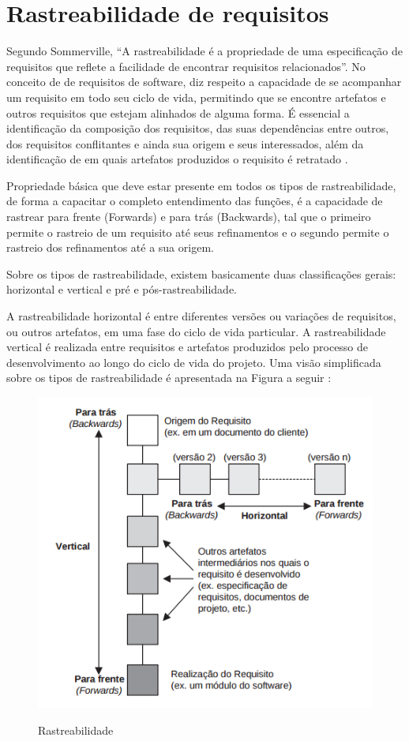 \section{Rastreabilidade de requisitos}

Segundo Sommerville, “A rastreabilidade é a propriedade de uma especificação de requisitos que reflete a facilidade de encontrar requisitos relacionados”. No conceito de de requisitos de software, diz respeito a capacidade de se acompanhar um requisito em todo seu ciclo de vida, permitindo que se encontre artefatos e outros requisitos que estejam alinhados de alguma forma. É essencial a identificação da composição dos requisitos, das suas dependências entre outros, dos requisitos conflitantes e ainda sua origem e seus interessados, além da identificação de em quais artefatos produzidos o requisito é retratado \cite {falbo}.

Propriedade básica que deve estar presente em todos os tipos de rastreabilidade, de forma a capacitar o completo entendimento das funções, é a capacidade de rastrear para frente (Forwards) e para trás (Backwards), tal que o primeiro permite o rastreio de um requisito até seus refinamentos e  o segundo permite o rastreio dos refinamentos até a sua origem. \cite {davis}

Sobre os tipos de rastreabilidade, existem basicamente duas classificações gerais: horizontal e vertical e pré e pós-rastreabilidade. \cite {gotel}

A rastreabilidade horizontal é entre diferentes versões ou variações de requisitos, ou outros artefatos, em uma fase do ciclo de vida particular. A rastreabilidade vertical é realizada entre requisitos e artefatos produzidos pelo processo de desenvolvimento ao longo do ciclo de vida do projeto.
Uma visão simplificada sobre os tipos de rastreabilidade é apresentada na Figura a seguir \cite {inpe}:

\FloatBarrier
\begin{figure}[!htpd]
		\centering
		\includegraphics[scale=0.8]{figuras/Rastreabilidade}
		\label{img:SAF}
		\caption{Rastreabilidade}
\end{figure}
\FloatBarrier

